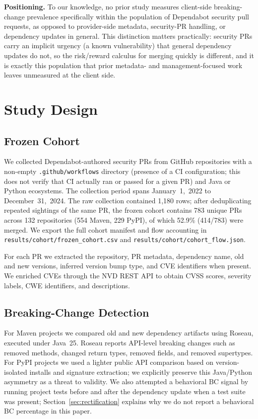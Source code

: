 \documentclass[10pt,journal]{IEEEtran}
\begin{document}
\textbf{Positioning.} To our knowledge, no prior study measures client-side
breaking-change prevalence specifically within the population of Dependabot
security pull requests, as opposed to provider-side metadata, security-PR
handling, or dependency updates in general. This distinction matters
practically: security PRs carry an implicit urgency (a known vulnerability)
that general dependency updates do not, so the risk/reward calculus for
merging quickly is different, and it is exactly this population that prior
metadata- and management-focused work leaves unmeasured at the client side.

\section{Study Design}
\subsection{Frozen Cohort}
We collected Dependabot-authored security PRs from GitHub repositories with a non-empty \texttt{.github/workflows} directory (presence of a CI configuration; this does not verify that CI actually ran or passed for a given PR) and Java or Python ecosystems. The collection period spans January~1,~2022 to December~31,~2024. The raw collection contained 1{,}180 rows; after deduplicating repeated sightings of the same PR, the frozen cohort contains 783 unique PRs across 132 repositories (554 Maven, 229 PyPI), of which 52.9\% (414/783) were merged. We export the full cohort manifest and flow accounting in \texttt{results/cohort/frozen\_cohort.csv} and \texttt{results/cohort/cohort\_flow.json}.

For each PR we extracted the repository, PR metadata, dependency name, old and new versions, inferred version bump type, and CVE identifiers when present. We enriched CVEs through the NVD REST API to obtain CVSS scores, severity labels, CWE identifiers, and descriptions.

\subsection{Breaking-Change Detection}
For Maven projects we compared old and new dependency artifacts using Roseau, executed under Java~25. Roseau reports API-level breaking changes such as removed methods, changed return types, removed fields, and removed supertypes. For PyPI projects we used a lighter public API comparison based on version-isolated installs and signature extraction; we explicitly preserve this Java/Python asymmetry as a threat to validity. We also attempted a behavioral BC signal by running project tests before and after the dependency update when a test suite was present; Section~\ref{sec:rectification} explains why we do not report a behavioral BC percentage in this paper.
\end{document}
